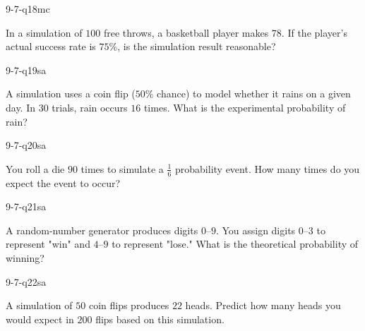 \begin{practiceQuestion}{9-7-q18}{mc}
\begin{questionText}
In a simulation of $100$ free throws, a basketball player makes $78$. If the player's actual success rate is $75\%$, is the simulation result reasonable?
\end{questionText}
\end{practiceQuestion}


\begin{practiceQuestion}{9-7-q19}{sa}
\begin{questionText}
A simulation uses a coin flip ($50\%$ chance) to model whether it rains on a given day. In $30$ trials, rain occurs $16$ times. What is the experimental probability of rain?
\end{questionText}
\end{practiceQuestion}

\begin{practiceQuestion}{9-7-q20}{sa}
\begin{questionText}
You roll a die $90$ times to simulate a $\frac{1}{6}$ probability event. How many times do you expect the event to occur?
\end{questionText}
\end{practiceQuestion}

\begin{practiceQuestion}{9-7-q21}{sa}
\begin{questionText}
A random-number generator produces digits $0$--$9$. You assign digits $0$--$3$ to represent "win" and $4$--$9$ to represent "lose." What is the theoretical probability of winning?
\end{questionText}
\end{practiceQuestion}

\begin{practiceQuestion}{9-7-q22}{sa}
\begin{questionText}
A simulation of $50$ coin flips produces $22$ heads. Predict how many heads you would expect in $200$ flips based on this simulation.
\end{questionText}
\end{practiceQuestion}

